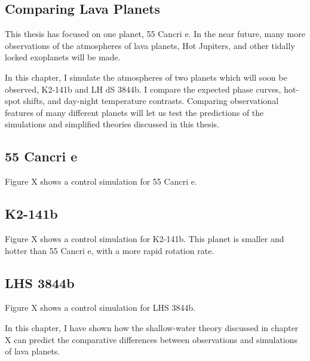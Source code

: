 \begin{SingleSpace}
\chapter{Comparing Lava Planets}
\vspace{0.5cm}
\end{SingleSpace}
\vspace{0.5cm}

This thesis has focused on one planet, 55 Cancri e. In the near future, many more observations of the atmospheres of lava planets, Hot Jupiters, and other tidally locked exoplanets will be made.

In this chapter, I simulate the atmospheres of two planets which will soon be observed, K2-141b and LH dS 3844b. I compare the expected phase curves, hot-spot shifts, and day-night temperature contrasts. Comparing observational features of many different planets will let us test the predictions of the simulations and simplified theories discussed in this thesis.

\section{55 Cancri e}

Figure X shows a control simulation for 55 Cancri e.

\section{K2-141b}

Figure X shows a control simulation for K2-141b. This planet is smaller and hotter than 55 Cancri e, with a more rapid rotation rate.

\section{LHS 3844b}

Figure X shows a control simulation for LHS 3844b.


In this chapter, I have shown how the shallow-water theory discussed in chapter X can predict the comparative differences between observations and simulations of lava planets.




% 
% 
